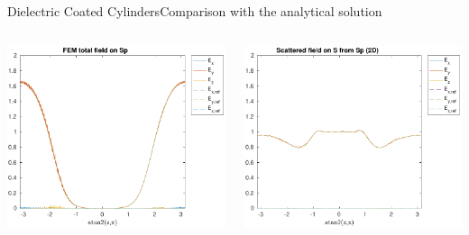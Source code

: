 \begin{frame}[allowframebreaks]{Dielectric Coated Cylinders}{Comparison with the analytical solution }
    \begin{columns}
      \includegraphics[width=\linewidth]{results/TMc4/E_Sp.pdf}

      \includegraphics[width=\linewidth]{results/TMc4/E_S.pdf}
      

\end{columns}
\end{frame}
